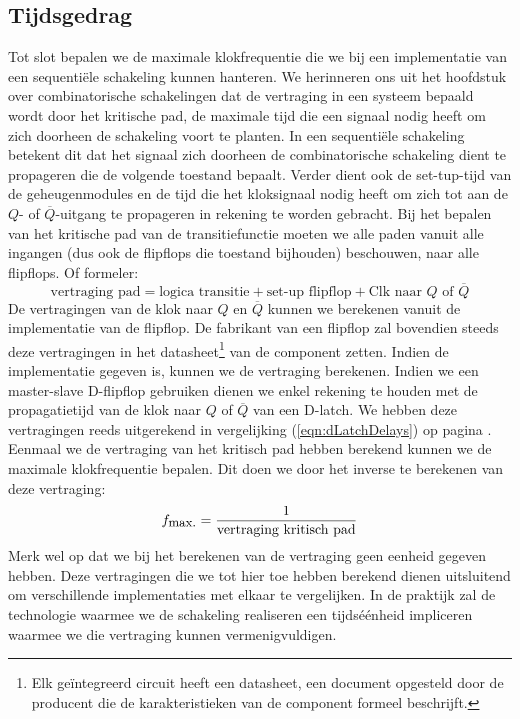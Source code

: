 \subsection{Tijdsgedrag}
\label{ss:timeBehaviorSeqSync}
Tot slot bepalen we de maximale klokfrequentie die we bij een implementatie van een sequenti\"ele schakeling kunnen hanteren. We herinneren ons uit het hoofdstuk over combinatorische schakelingen dat de vertraging in een systeem bepaald wordt door het kritische pad, de maximale tijd die een signaal nodig heeft om zich doorheen de schakeling voort te planten. In een sequenti\"ele schakeling betekent dit dat het signaal zich doorheen de combinatorische schakeling dient te propageren die de volgende toestand bepaalt. Verder dient ook de set-tup-tijd van de geheugenmodules en de tijd die het kloksignaal nodig heeft om zich tot aan de $Q$- of $\overline{Q}$-uitgang te propageren in rekening te worden gebracht. Bij het bepalen van het kritische pad van de transitiefunctie moeten we alle paden vanuit alle ingangen (dus ook de flipflops die toestand bijhouden) beschouwen, naar alle flipflops. Of formeler:
\begin{equation}
\mbox{vertraging pad}=\mbox{logica transitie}+\mbox{set-up flipflop}+\mbox{Clk naar $Q$ of $\overline{Q}$}
\end{equation}
De vertragingen van de klok naar $Q$ en $\overline{Q}$ kunnen we berekenen vanuit de implementatie van de flipflop. De fabrikant van een flipflop zal bovendien steeds deze vertragingen in het datasheet\footnote{Elk ge\"integreerd circuit heeft een datasheet, een document opgesteld door de producent die de karakteristieken van de component formeel beschrijft.} van de component zetten. Indien de implementatie gegeven is, kunnen we de vertraging berekenen. Indien we een master-slave D-flipflop gebruiken dienen we enkel rekening te houden met de propagatietijd van de klok naar $Q$ of $\overline{Q}$ van een D-latch. We hebben deze vertragingen reeds uitgerekend in vergelijking (\ref{eqn:dLatchDelays}) op pagina \pageref{eqn:dLatchDelays}. Eenmaal we de vertraging van het kritisch pad hebben berekend kunnen we de maximale klokfrequentie bepalen. Dit doen we door het inverse te berekenen van deze vertraging:
\begin{equation}
f_{\mbox{\small{max.}}}=\displaystyle\frac{1}{\mbox{vertraging kritisch pad}}
\end{equation}
Merk wel op dat we bij het berekenen van de vertraging geen eenheid gegeven hebben. Deze vertragingen die we tot hier toe hebben berekend dienen uitsluitend om verschillende implementaties met elkaar te vergelijken. In de praktijk zal de technologie waarmee we de schakeling realiseren een tijds\'e\'enheid impliceren waarmee we die vertraging kunnen vermenigvuldigen.
